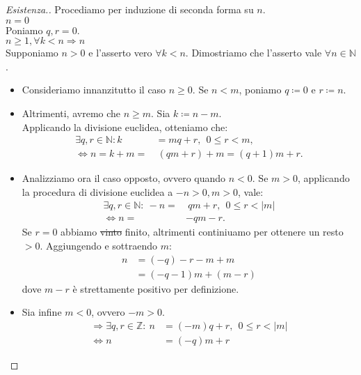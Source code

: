 \documentclass[12pt]{article}
\newcommand{\N}{\mathbb{N}}
\newcommand{\Z}{\mathbb{Z}}
\newcommand{\sesolose}{\Leftrightarrow}
\newcommand{\implica}{\Longrightarrow}
\newcommand{\nin}{\forall n\in\N}
\renewcommand\qedsymbol{$\blacksquare$}
\newcommand{\baseinduz}[1]{\\[1\baselineskip]{\boldmath$n = #1$}}
\newcommand{\induzdue}[1]{\\[1\baselineskip]{\boldmath$n \ge #1, \forall k < n \implica n$}}
\begin{document}
\renewcommand\qedsymbol{$\square$}
\begin{proof}[Esistenza.]
	Procediamo per induzione di seconda forma su $n$.
	\baseinduz{0}
	\\Poniamo $q, r = 0$.
	\induzdue{1}
	\\Supponiamo $n > 0$ e l'asserto vero $\forall k < n$. Dimostriamo che l'asserto vale $\nin$.
	\begin{itemize}
		\item Consideriamo innanzitutto il caso $n \ge 0$. Se $n < m$, poniamo $q \coloneqq 0$ e $ r \coloneqq n$.
		\item Altrimenti, avremo che $n \ge m$. Sia $k \coloneqq n - m$.\\Applicando la divisione euclidea, otteniamo che:
		      \begin{align*}
			      \exists q, r \in \N : k & = mq + r, \ \ 0 \le r <m,     \\
			      \sesolose n = k + m =   & \ (qm + r) + m = (q+1) m + r.
		      \end{align*}
		\item Analizziamo ora il caso opposto, ovvero quando $n < 0$. Se $m > 0$, applicando la procedura di divisione euclidea a $-n > 0, m >0$, vale:
		      \begin{align*}
			      \exists q, r \in \N:\ -n = & \ qm + r, \ \ 0 \le r < |m| \\
			      \sesolose n =              & - qm - r.
		      \end{align*}
		      Se $ r = 0$ abbiamo \sout{vinto} finito, altrimenti continiuamo per ottenere un resto $> 0$. Aggiungendo e sottraendo $m$:
		      \begin{align*}
			      n & = (-q)-r-m+m    \\
			        & = (-q-1)m+(m-r)
		      \end{align*}
		      dove $m-r$ è strettamente positivo per definizione.
		\item Sia infine $m < 0$, ovvero $-m > 0$.
		      \begin{align*}
			      \implica \exists q, r \in \Z:\ n & = (-m)q + r, \ \ 0 \le r < |m| \\
			      \sesolose n                      & = (-q)m + r
		      \end{align*}
	\end{itemize}
\end{proof}
\renewcommand\qedsymbol{$\blacksquare$}
\end{document}
